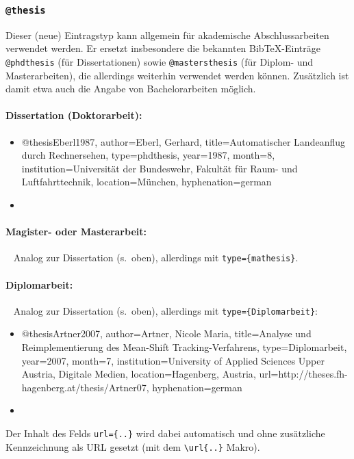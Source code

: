 
\subsubsection{\texttt{@thesis}}
\label{sec:@thesis}
Dieser (neue) Eintragstyp kann allgemein für akademische Abschlussarbeiten verwendet werden. Er ersetzt
insbesondere die bekannten BibTeX-Einträge \texttt{@phdthesis} (für Dissertationen) sowie
\texttt{@mastersthesis} (für Di\-plom- und Masterarbeiten), die allerdings weiterhin verwendet werden können. Zusätzlich ist damit etwa auch die Angabe von Bachelorarbeiten möglich.

\paragraph{Dissertation (Doktorarbeit):}
%
\begin{itemize}
\item[]
\begin{GenericCode}[numbers=none]
@thesis{Eberl1987,
  author={Eberl, Gerhard},
  title={Automatischer Landeanflug durch Rechnersehen},
  type={phdthesis},
  year={1987},
  month={8},
  institution={Universität der Bundeswehr, Fakultät für Raum- und Luftfahrttechnik},
  location={München},
  hyphenation={german}
}
\end{GenericCode}
\item[\cite{Eberl1987}] 
\end{itemize}

\paragraph{Magister- oder Masterarbeit:} ~ \newline
Analog zur Dissertation (s.\ oben), allerdings mit \texttt{type=\{mathesis\}}.%


\paragraph{Diplomarbeit:} ~ \newline
Analog zur Dissertation (s.\ oben), allerdings mit \texttt{type=\obnh\{Diplomarbeit\}}:%
%
\begin{itemize}
\item[]
\begin{GenericCode}[numbers=none]
@thesis{Artner2007,
  author={Artner, Nicole Maria},
  title={Analyse und Reimplementierung des Mean-Shift Tracking-Verfahrens},
  type={Diplomarbeit},
  year={2007},
  month={7},
  institution={University of Applied Sciences Upper Austria, Digitale Medien},
  location={Hagenberg, Austria},
  url={http://theses.fh-hagenberg.at/thesis/Artner07},
  hyphenation={german}
}
\end{GenericCode}
\item[\cite{Artner2007}] 
\end{itemize}
%
Der Inhalt des Felds \verb!url={..}! wird dabei automatisch und ohne zusätzliche
Kennzeichnung als URL gesetzt (mit dem \verb!\url{..}! Makro).


